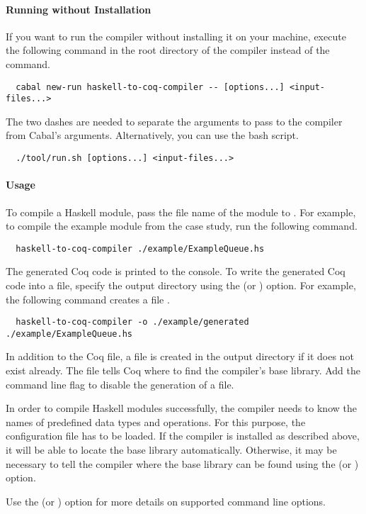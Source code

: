 \paragraph{Running without Installation}
If you want to run the compiler without installing it on your machine, execute the following command in the root directory of the compiler instead of the  command.
\begin{verbatim}
  cabal new-run haskell-to-coq-compiler -- [options...] <input-files...>
\end{verbatim}
The two dashes are needed to separate the arguments to pass to the compiler from Cabal's arguments.
Alternatively, you can use the  bash script.
\begin{verbatim}
  ./tool/run.sh [options...] <input-files...>
\end{verbatim}

\paragraph{Usage}
To compile a Haskell module, pass the file name of the module to .
For example, to compile the example module from the case study, run the following command.
\begin{verbatim}
  haskell-to-coq-compiler ./example/ExampleQueue.hs
\end{verbatim}
The generated Coq code is printed to the console.
To write the generated Coq code into a file, specify the output directory using the  (or ) option.
For example, the following command creates a file .
\begin{verbatim}
  haskell-to-coq-compiler -o ./example/generated ./example/ExampleQueue.hs
\end{verbatim}
In addition to the Coq file, a  file is created in the output directory if it does not exist already.
The  file tells Coq where to find the compiler's base library.
Add the  command line flag to disable the generation of a  file.

In order to compile Haskell modules successfully, the compiler needs to know the names of predefined data types and operations.
For this purpose, the  configuration file has to be loaded.
If the compiler is installed as described above, it will be able to locate the base library automatically.
Otherwise, it may be necessary to tell the compiler where the base library can be found using the  (or ) option.

Use the  (or ) option for more details on supported command line options.
